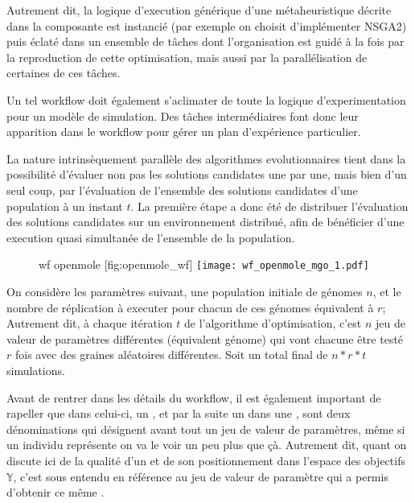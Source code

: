 Autrement dit, la logique d'execution générique d'une métaheuristique décrite dans la composante  est instancié (par exemple on choisit d'implémenter NSGA2) puis éclaté dans un ensemble de tâches dont l'organisation est guidé à la fois par la reproduction de cette optimisation, mais aussi par la parallélisation de certaines de ces tâches. 

Un tel workflow doit également s'aclimater de toute la logique d'experimentation pour un modèle de simulation. Des tâches intermédiaires font donc leur apparition dans le workflow pour gérer un plan d'expérience particulier.

La nature intrinsèquement parallèle des algorithmes evolutionnaires tient dans la possibilité d'évaluer non pas les solutions candidates une par une, mais bien d'un seul coup, par l'évaluation de l'ensemble des solutions candidates d'une population à un instant $t$. La première étape a donc été de distribuer l'évaluation des solutions candidates sur un environnement distribué, afin de bénéficier d'une execution quasi simultanée de l'ensemble de la population.

\begin{figure}[H]
	\begin{sidecaption}[fortoc]{wf openmole }[fig:openmole_wf]
		\centering
		\texttt{[image: wf\_openmole\_mgo\_1.pdf]}{
		}
  \end{sidecaption}
\end{figure}

On considère les paramètres suivant, une population initiale de génomes $n$, et le nombre de réplication à executer pour chacun de ces génomes équivalent à $r$; Autrement dit, à chaque itération $t$ de l'algorithme d'optimisation, c'est $n$ jeu de valeur de paramètres différentes (équivalent génome) qui vont chacune être testé $r$ fois avec des graines aléatoires différentes. Soit un total final de $n * r * t$ simulations. 

Avant de rentrer dans les détails du workflow, il est également important de rapeller que dans celui-ci, un , et par la suite un  dans une , sont deux dénominations qui désignent avant tout un jeu de valeur de paramètres, même si un individu représente on va le voir un peu plus que çà. Autrement dit, quant on discute ici de la qualité d'un  et de son positionnement dans l'espace des objectifs $\mathbb{Y}$, c'est sous entendu en référence au jeu de valeur de paramètre qui a permis d'obtenir ce même .

